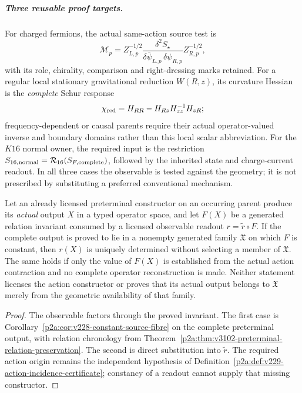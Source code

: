 \documentclass[12pt,a4paper]{article}
\begin{document}
\subparagraph{Three reusable proof targets.}
For charged fermions, the actual same-action source test is
\[
 \mathscr M_p=Z_{L,p}^{-1/2}
 \frac{\delta^2 S_\star}{\delta\bar\psi_{L,p}\,\delta\psi_{R,p}}
 Z_{R,p}^{-1/2},
\]
with its role, chirality, comparison and right-dressing marks retained.
For a regular local stationary gravitational reduction $W(R,z)$, its
curvature Hessian is the \emph{complete} Schur response
\[
 \chi_{\rm red}=H_{RR}-H_{Rz}H_{zz}^{-1}H_{zR};
\]
frequency-dependent or causal parents require their actual operator-valued
inverse and boundary domains rather than this local scalar abbreviation.
For the $K16$ normal owner, the required input is the restriction
$S_{16,{\rm normal}}=\mathcal R_{16}(S_{F,{\rm complete}})$, followed by
the inherited state and charge-current readout.  In all three cases the
observable is tested against the geometry; it is not prescribed by
substituting a preferred conventional mechanism.



\begin{corollary}
\label{p2a:cor:v239-observable-minimal-action}
Let an already licensed preterminal constructor on an occurring parent
produce its \emph{actual} output $X$ in a typed operator space, and let
$F(X)$ be a generated relation invariant consumed by a licensed observable
readout $r=\widetilde r\circ F$. If the complete output is proved to lie
in a nonempty generated family $\mathfrak X$ on which $F$ is constant,
then $r(X)$ is uniquely determined without selecting a member of
$\mathfrak X$. The same holds if only the value of $F(X)$ is established
from the actual action contraction and no complete operator reconstruction
is made. Neither statement licenses the action constructor or proves that
its actual output belongs to $\mathfrak X$ merely from the geometric
availability of that family.
\end{corollary}
\begin{proof}
The observable factors through the proved invariant. The first case
is Corollary~\ref{p2a:cor:v228-constant-source-fibre} on the complete
preterminal output, with relation chronology from
Theorem~\ref{p2a:thm:v3102-preterminal-relation-preservation}.
The second is direct substitution into $\widetilde r$. The required
action origin remains the independent hypothesis of
Definition~\ref{p2a:def:v229-action-incidence-certificate}; constancy
of a readout cannot supply that missing constructor.
\end{proof}
\end{document}
